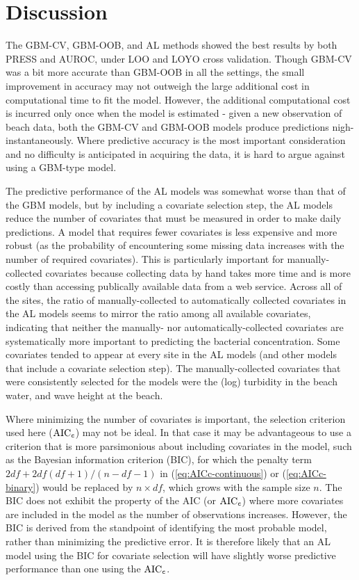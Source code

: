 \section{Discussion}\label{discussion}

The GBM-CV, GBM-OOB, and AL methods showed the best results by both
PRESS and AUROC, under LOO and LOYO cross validation. Though GBM-CV was
a bit more accurate than GBM-OOB in all the settings, the small
improvement in accuracy may not outweigh the large additional cost in
computational time to fit the model. However, the additional
computational cost is incurred only once when the model is estimated -
given a new observation of beach data, both the GBM-CV and GBM-OOB
models produce predictions nigh-instantaneously. Where predictive
accuracy is the most important consideration and no difficulty is
anticipated in acquiring the data, it is hard to argue against using a
GBM-type model.

The predictive performance of the AL models was somewhat worse than that
of the GBM models, but by including a covariate selection step, the AL
models reduce the number of covariates that must be measured in order to
make daily predictions. A model that requires fewer covariates is less
expensive and more robust (as the probability of encountering some
missing data increases with the number of required covariates). This is
particularly important for manually-collected covariates because
collecting data by hand takes more time and is more costly than
accessing publically available data from a web service. Across all of
the sites, the ratio of manually-collected to automatically collected
covariates in the AL models seems to mirror the ratio among all
available covariates, indicating that neither the manually- nor
automatically-collected covariates are systematically more important to
predicting the bacterial concentration. Some covariates tended to appear
at every site in the AL models (and other models that include a
covariate selection step). The manually-collected covariates that were
consistently selected for the models were the (log) turbidity in the
beach water, and wave height at the beach.

Where minimizing the number of covariates is important, the selection
criterion used here (\(\text{AIC}_{\tt c}\)) may not be ideal. In that
case it may be advantageous to use a criterion that is more parsimonious
about including covariates in the model, such as the Bayesian
information criterion (BIC), for which the penalty term
\(2df + 2df(df+1)/(n-df-1)\) in (\ref{eq:AICc-continuous}) or
(\ref{eq:AICc-binary}) would be replaced by \(n \times df\), which grows
with the sample size \(n\). The BIC does not exhibit the property of the
AIC (or \(\text{AIC}_{\tt c}\)) where more covariates are included in
the model as the number of observations increases. However, the BIC is
derived from the standpoint of identifying the most probable model,
rather than minimizing the predictive error. It is therefore likely that
an AL model using the BIC for covariate selection will have slightly
worse predictive performance than one using the \(\text{AIC}_{\tt c}\).

